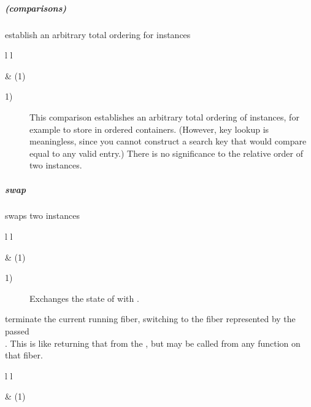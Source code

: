 \subparagraph*{(comparisons)}
establish an arbitrary total ordering for \fiber instances\\

\begin{tabular}{ l l }
    \midrule

     & (1)\\

    \midrule
\end{tabular}

\begin{description}
    \item[1)] This comparison establishes an arbitrary total ordering of \fiber
              instances, for example to store in ordered containers. (However,
              key lookup is meaningless, since you cannot construct a search key
              that would compare equal to any valid entry.) There is no significance
              to the relative order of two instances.
\end{description}


\subparagraph*{swap}
swaps two \fiber instances\\

\begin{tabular}{ l l }
    \midrule

     & (1)\\

    \midrule
\end{tabular}

\begin{description}
    \item[1)] Exchanges the state of  with .\\
\end{description}



terminate the current running fiber, switching to the fiber represented by
the passed\\\fiber. This is like returning that \fiber from the \entryfn, but may
be called from any function on that fiber.\\

\begin{tabular}{ l l }
    \midrule

     & (1)\\

    \midrule
\end{tabular}

